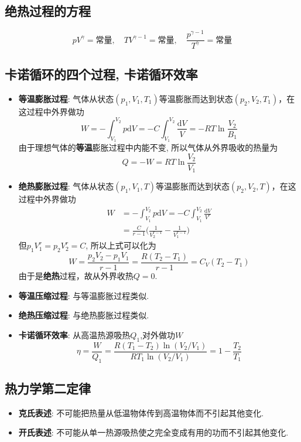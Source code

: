 \subsection{绝热过程的方程}
\[
pV^\gamma = \textrm{常量},\quad
TV^{\gamma-1} = \textrm{常量},\quad
\frac{p^{\gamma-1}}{T^\gamma}=\textrm{常量}
\]

\subsection{卡诺循环的四个过程, 卡诺循环效率}
\begin{itemize}
\item\textbf{等温膨胀过程}: 气体从状态$(p_1,V_1,T_1)$等温膨胀而达到状态$(p_2,V_2,T_1)$，在这过程中外界做功
\[
W=-\int_{V_1}^{V_2}p\textrm{d}V=-C\int_{V_1}^{V_2}\frac{\textrm{d}V}{V}=-RT\ln\frac{V_2}{B_1}
\]
由于理想气体的\textbf{等温}膨胀过程中内能不变, 所以气体从外界吸收的热量为
\[
Q=-W=RT\ln\frac{V_2}{V_1}
\]
\item\textbf{绝热膨胀过程}: 气体从状态$(p_1,V_1,T)$等温膨胀而达到状态$(p_2,V_2,T)$，在这过程中外界做功
\begin{align*}
W & =-\int_{V_{1}}^{V_{2}}p\textrm{d}V=-C\int_{V_{1}}^{V_{2}}\frac{\textrm{d}V}{V^{r}}\\
 & =\frac{C}{r-1}\bigg(\frac{1}{V_{2}^{r-1}}-\frac{1}{V_{1}^{r-1}}\bigg)
\end{align*}
但$p_1V_1^r=p_2V_2^r=C$, 所以上式可以化为
\[
W=\frac{p_2V_2-p_1V_1}{r-1}=\frac{R(T_2-T_1)}{r-1}=C_V(T_2-T_1)
\]
由于是\textbf{绝热}过程，故从外界收热$Q=0$.
\item \textbf{等温压缩过程}: 与等温膨胀过程类似.
\item \textbf{绝热压缩过程}: 与绝热膨胀过程类似.
\item \textbf{卡诺循环效率}: 从高温热源吸热$Q_1$,对外做功$W$
\[
\eta = \frac{W}{Q_1} = \frac{R(T_1-T_2)\ln (V_2/V_1)}{RT_1\ln (V_2/V_1)} = 1-\frac{T_2}{T_1}
\]
\end{itemize}

\subsection{热力学第二定律}
\begin{itemize}
\item\textbf{克氏表述}: 不可能把热量从低温物体传到高温物体而不引起其他变化.
\item\textbf{开氏表述}: 不可能从单一热源吸热使之完全变成有用的功而不引起其他变化.
\end{itemize}

